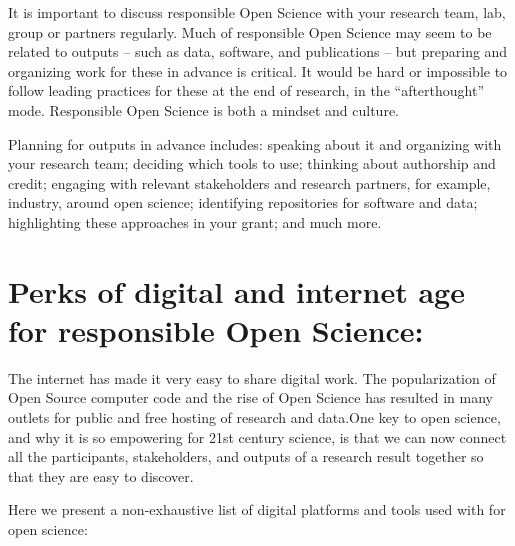 \documentclass[
  letterpaper,
  DIV=11,
  numbers=noendperiod]{scrreport}
\begin{document}
It is important to discuss responsible Open Science with your research
team, lab, group or partners regularly. Much of responsible Open Science
may seem to be related to outputs -- such as data, software, and
publications -- but preparing and organizing work for these in advance
is critical. It would be hard or impossible to follow leading practices
for these at the end of research, in the ``afterthought'' mode.
Responsible Open Science is both a mindset and culture.

Planning for outputs in advance includes: speaking about it and
organizing with your research team; deciding which tools to use;
thinking about authorship and credit; engaging with relevant
stakeholders and research partners, for example, industry, around open
science; identifying repositories for software and data; highlighting
these approaches in your grant; and much more.

\hypertarget{perks-of-digital-and-internet-age-for-responsible-open-science}{%
\section{Perks of digital and internet age for responsible Open
Science:}\label{perks-of-digital-and-internet-age-for-responsible-open-science}}

The internet has made it very easy to share digital work. The
popularization of Open Source computer code and the rise of Open Science
has resulted in many outlets for public and free hosting of research and
data.One key to open science, and why it is so empowering for 21st
century science, is that we can now connect all the participants,
stakeholders, and outputs of a research result together so that they are
easy to discover.

Here we present a non-exhaustive list of digital platforms and tools
used with for open science:
\end{document}
